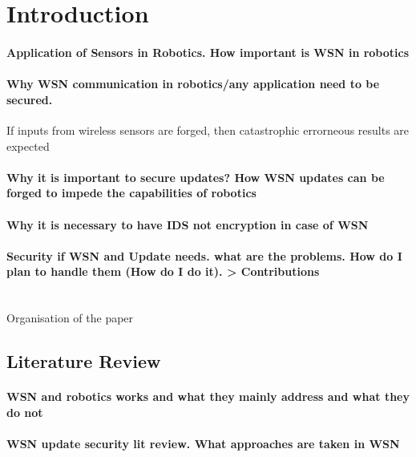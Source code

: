 \documentclass[conference,final]{IEEEtran}
\begin{document}
\section{Introduction}
\paragraph{Application of Sensors in Robotics. How important is WSN in robotics}
\paragraph{Why WSN communication in robotics/any application need to be secured. }
If inputs from wireless sensors are forged, then catastrophic errorneous results are expected			
\paragraph{Why it is important to secure updates? How WSN updates can be forged to impede the capabilities of robotics}
\paragraph{Why it is necessary to have IDS not encryption in case of WSN}
\paragraph{Security if WSN and Update needs. what are the problems. How do I plan to handle them (How do I do it). > Contributions} \\
Organisation of the paper

\subsection{Literature Review}
\paragraph{WSN and robotics works and what they mainly address and what they do not}
\paragraph{WSN update security lit review. What approaches are taken in WSN}
\end{document}
